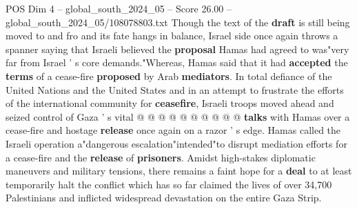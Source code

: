 \begin{textsample}{POS Dim 4 – global\_south\_2024\_05 – Score 26.00 – global\_south\_2024\_05/108078803.txt}
Though the text of the \textbf{draft} is still being moved to and fro and its fate hangs in balance, Israel side once again throws a spanner saying that Israeli believed the \textbf{proposal} Hamas had agreed to was"very far from Israel ' s core demands."Whereas, Hamas said that it had \textbf{accepted} the \textbf{terms} of a cease-fire \textbf{proposed} by Arab \textbf{mediators}.
In total defiance of the United Nations and the United States and in an attempt to frustrate the efforts of the international community for \textbf{ceasefire}, Israeli troops moved ahead and seized control of Gaza ' s vital @ @ @ @ @ @ @ @ @ @ \textbf{talks} with Hamas over a cease-fire and hostage \textbf{release} once again on a razor ' s edge.
Hamas called the Israeli operation a"dangerous escalation"intended"to disrupt mediation efforts for a cease-fire and the \textbf{release} of \textbf{prisoners}.
Amidst high-stakes diplomatic maneuvers and military tensions, there remains a faint hope for a \textbf{deal} to at least temporarily halt the conflict which has so far claimed the lives of over 34,700 Palestinians and inflicted widespread devastation on the entire Gaza Strip.

\end{textsample}
